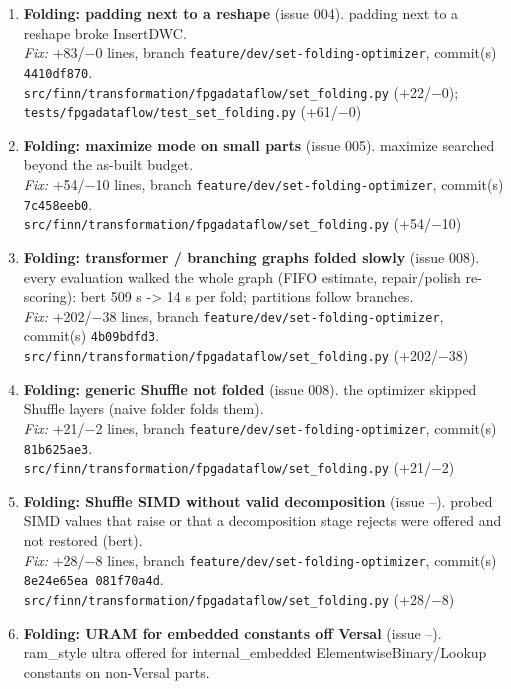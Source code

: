 \documentclass[a4paper,10pt]{article}
\begin{document}
\begin{enumerate}
\item \textbf{Folding: padding next to a reshape} (issue 004). padding next to a reshape broke InsertDWC.\\
\emph{Fix:} +83/$-$0 lines, branch \texttt{feature/dev/set-folding-optimizer}, commit(s) \texttt{4410df870}.\\
{\footnotesize \texttt{src/finn/transformation/fpgadataflow/set\_folding.py} (+22/$-$0); \texttt{tests/fpgadataflow/test\_set\_folding.py} (+61/$-$0)}
\item \textbf{Folding: maximize mode on small parts} (issue 005). maximize searched beyond the as-built budget.\\
\emph{Fix:} +54/$-$10 lines, branch \texttt{feature/dev/set-folding-optimizer}, commit(s) \texttt{7c458eeb0}.\\
{\footnotesize \texttt{src/finn/transformation/fpgadataflow/set\_folding.py} (+54/$-$10)}
\item \textbf{Folding: transformer / branching graphs folded slowly} (issue 008). every evaluation walked the whole graph (FIFO estimate, repair/polish re-scoring): bert 509 s -> 14 s per fold; partitions follow branches.\\
\emph{Fix:} +202/$-$38 lines, branch \texttt{feature/dev/set-folding-optimizer}, commit(s) \texttt{4b09bdfd3}.\\
{\footnotesize \texttt{src/finn/transformation/fpgadataflow/set\_folding.py} (+202/$-$38)}
\item \textbf{Folding: generic Shuffle not folded} (issue 008). the optimizer skipped Shuffle layers (naive folder folds them).\\
\emph{Fix:} +21/$-$2 lines, branch \texttt{feature/dev/set-folding-optimizer}, commit(s) \texttt{81b625ae3}.\\
{\footnotesize \texttt{src/finn/transformation/fpgadataflow/set\_folding.py} (+21/$-$2)}
\item \textbf{Folding: Shuffle SIMD without valid decomposition} (issue --). probed SIMD values that raise or that a decomposition stage rejects were offered and not restored (bert).\\
\emph{Fix:} +28/$-$8 lines, branch \texttt{feature/dev/set-folding-optimizer}, commit(s) \texttt{8e24e65ea 081f70a4d}.\\
{\footnotesize \texttt{src/finn/transformation/fpgadataflow/set\_folding.py} (+28/$-$8)}
\item \textbf{Folding: URAM for embedded constants off Versal} (issue --). ram\_style ultra offered for internal\_embedded ElementwiseBinary/Lookup constants on non-Versal parts.\\

\end{enumerate}
\end{document}

